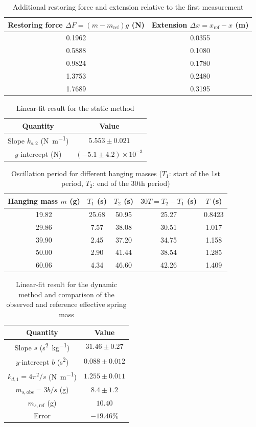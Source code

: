 \begin{table}[htb!]
\centering
\caption{Additional restoring force and extension relative to the first measurement}
\begin{tabular}{cc}
\toprule
Restoring force $\Delta F=(m-m_{\text{ref}})g$ (\unit{\N}) & Extension $\Delta x=x_{\text{ref}}-x$ (\unit{\m}) \\
\midrule
0.1962 & 0.0355 \\
0.5888 & 0.1080 \\
0.9824 & 0.1780 \\
1.3753 & 0.2480 \\
1.7689 & 0.3195 \\
\bottomrule
\end{tabular}
\end{table}
\begin{table}[htb!]
\centering
\caption{Linear-fit result for the static method}
\begin{tabular}{cc}
\toprule
Quantity & Value \\
\midrule
Slope $k_{s,2}$ (\unit{\N\per\m}) & $5.553 \pm 0.021$ \\
$y$-intercept (\unit{\N}) & $(-5.1 \pm 4.2)\times 10^{-3}$ \\
\bottomrule
\end{tabular}
\end{table}
\begin{table}[htb!]
\centering
\caption{Oscillation period for different hanging masses ($T_{1}$: start of the 1st period, $T_{2}$: end of the 30th period)}
\begin{tabular}{ccccc}
\toprule
Hanging mass $m$ (\unit{\g}) & $T_{1}$ (\unit{\s}) & $T_{2}$ (\unit{\s}) & $30T=T_{2}-T_{1}$ (\unit{\s}) & $T$ (\unit{\s}) \\
\midrule
19.82 & 25.68 & 50.95 & 25.27 & 0.8423 \\
29.86 & 7.57 & 38.08 & 30.51 & 1.017 \\
39.90 & 2.45 & 37.20 & 34.75 & 1.158 \\
50.00 & 2.90 & 41.44 & 38.54 & 1.285 \\
60.06 & 4.34 & 46.60 & 42.26 & 1.409 \\
\bottomrule
\end{tabular}
\end{table}
\begin{table}[htb!]
\centering
\caption{Linear-fit result for the dynamic method and comparison of the observed and reference effective spring mass}
\begin{tabular}{cc}
\toprule
Quantity & Value \\
\midrule
Slope $s$ (\unit{\s\squared\per\kg}) & $31.46 \pm 0.27$ \\
$y$-intercept $b$ (\unit{\s\squared}) & $0.088 \pm 0.012$ \\
$k_{d,1}=4\pi^{2}/s$ (\unit{\N\per\m}) & $1.255 \pm 0.011$ \\
$m_{s,\text{obs}}=3b/s$ (\unit{\g}) & $8.4 \pm 1.2$ \\
$m_{s,\text{ref}}$ (\unit{\g}) & $10.40$ \\
Error & $-19.46\%$ \\
\bottomrule
\end{tabular}
\end{table}
